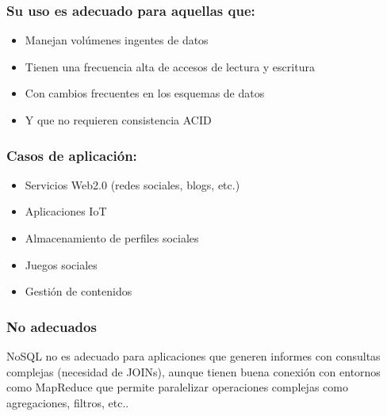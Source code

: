 \documentclass[preprint,12pt]{elsarticle}
\begin{document}
\subsubsection{\textbf{Su uso es adecuado para aquellas que:}}
\begin{itemize}
\item Manejan volúmenes ingentes de datos
\item Tienen una frecuencia alta de accesos de lectura y escritura
\item Con cambios frecuentes en los esquemas de datos
\item Y que no requieren consistencia ACID
\end{itemize}

\subsubsection{\textbf{Casos de aplicación:}}
\begin{itemize}
\item Servicios Web2.0 (redes sociales, blogs, etc.)
\item Aplicaciones IoT
\item Almacenamiento de perfiles sociales
\item Juegos sociales
\item Gestión de contenidos
\end{itemize}

\subsubsection{\textbf{No adecuados}}
NoSQL no es adecuado para aplicaciones que generen informes
con consultas complejas (necesidad de JOINs), aunque tienen
buena conexión con entornos como MapReduce que permite
paralelizar operaciones complejas como agregaciones, filtros,
etc..
\end{document}
